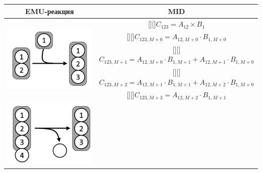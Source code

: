 \documentclass[14pt, a4paper]{extreport}
\newcommand{\adj}[1]{\raisebox{-2pt}[\height][\depth]{#1}}
\begin{document}
\begin{table}
	\begin{center}
		\begin{tabular}{c | c}
			EMU-реакция & MID\\
			\hline
			\multirow{5}{*}[-1mm]{
				\begin{minipage}{0.3\linewidth}
					\centering{Реакция конденсации}
					\includegraphics[scale=0.1]{EMU_reaction_1.png}
				\end{minipage}
			} 
			  & \adj{$C_{123} = A_{12} \times B_1$}\\[0.5ex]
			  & \adj{$C_{123,M+0} = A_{12,M+0} \cdot B_{1,M+0}$}\\ [0.5ex]
			  & \adj{$C_{123,M+1} = A_{12,M+0} \cdot B_{1,M+1} + A_{12,M+1} \cdot B_{1,M+0}$}\\ [0.5ex]
			  & \adj{$C_{123,M+2} = A_{12,M+1} \cdot B_{1,M+1} + A_{12,M+2} \cdot B_{1,M+0}$}\\ [0.5ex]
			  & \adj{$C_{123,M+3} = A_{12,M+2} \cdot B_{1,M+1}$} \\ [0.5ex]
			 \hline 
			 \multirow{5}{*}[-1mm]{
			 	\begin{minipage}{0.3\linewidth}
			 		\centering{Реакция расщепления}
			 		\includegraphics[scale=0.1]{EMU_reaction_2.png}

\end{minipage}}
\end{tabular}
\end{center}
\end{table}
\end{document}
